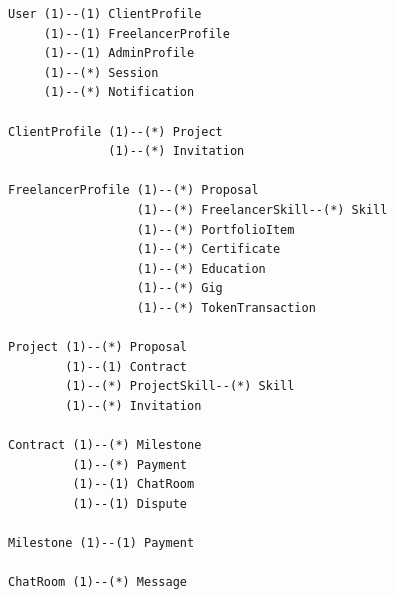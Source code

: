 \begin{lstlisting}[caption={Core Model Relationship Summary}]
User (1)--(1) ClientProfile
     (1)--(1) FreelancerProfile
     (1)--(1) AdminProfile
     (1)--(*) Session
     (1)--(*) Notification

ClientProfile (1)--(*) Project
              (1)--(*) Invitation

FreelancerProfile (1)--(*) Proposal
                  (1)--(*) FreelancerSkill--(*) Skill
                  (1)--(*) PortfolioItem
                  (1)--(*) Certificate
                  (1)--(*) Education
                  (1)--(*) Gig
                  (1)--(*) TokenTransaction

Project (1)--(*) Proposal
        (1)--(1) Contract
        (1)--(*) ProjectSkill--(*) Skill
        (1)--(*) Invitation

Contract (1)--(*) Milestone
         (1)--(*) Payment
         (1)--(1) ChatRoom
         (1)--(1) Dispute

Milestone (1)--(1) Payment

ChatRoom (1)--(*) Message
\end{lstlisting}
